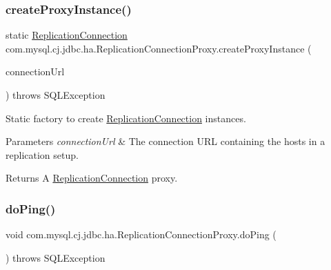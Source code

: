 \subsubsection{\texorpdfstring{create\+Proxy\+Instance()}{createProxyInstance()}}
{\footnotesize\ttfamily static \mbox{\hyperlink{interfacecom_1_1mysql_1_1cj_1_1jdbc_1_1ha_1_1_replication_connection}{Replication\+Connection}} com.\+mysql.\+cj.\+jdbc.\+ha.\+Replication\+Connection\+Proxy.\+create\+Proxy\+Instance (\begin{DoxyParamCaption}\item[{\mbox{\hyperlink{classcom_1_1mysql_1_1cj_1_1conf_1_1url_1_1_replication_connection_url}{Replication\+Connection\+Url}}}]{connection\+Url }\end{DoxyParamCaption}) throws S\+Q\+L\+Exception\hspace{0.3cm}{\ttfamily [static]}}

Static factory to create \mbox{\hyperlink{interfacecom_1_1mysql_1_1cj_1_1jdbc_1_1ha_1_1_replication_connection}{Replication\+Connection}} instances.


\begin{DoxyParams}{Parameters}
{\em connection\+Url} & The connection U\+RL containing the hosts in a replication setup. \\
\hline
\end{DoxyParams}
\begin{DoxyReturn}{Returns}
A \mbox{\hyperlink{interfacecom_1_1mysql_1_1cj_1_1jdbc_1_1ha_1_1_replication_connection}{Replication\+Connection}} proxy. 
\end{DoxyReturn}
\mbox{\label{classcom_1_1mysql_1_1cj_1_1jdbc_1_1ha_1_1_replication_connection_proxy_ae2c2446c646d5bc28578f3f35695ef45}} 
\subsubsection{\texorpdfstring{do\+Ping()}{doPing()}}
{\footnotesize\ttfamily void com.\+mysql.\+cj.\+jdbc.\+ha.\+Replication\+Connection\+Proxy.\+do\+Ping (\begin{DoxyParamCaption}{ }\end{DoxyParamCaption}) throws S\+Q\+L\+Exception}

